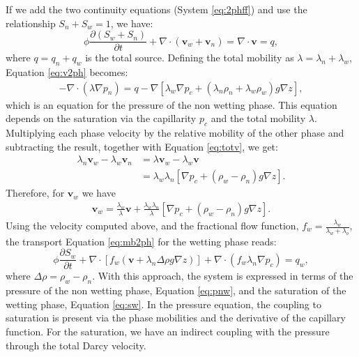 \documentclass[12pt]{article}
\begin{document}
If we add the two continuity equations (System \eqref{eq:2phff}) and use the relationship $S_n+S_w=1$, we have:
\begin{equation}\label{eq:v2ph}
 \phi\frac{\partial( {S}_{w}+S_n)}{\partial t}+\nabla \cdot ( \mathbf{v}_{w}+\mathbf{v}_n)=  \nabla \cdot \mathbf{v}=q,
\end{equation}
where $q=q_n+q_w$ is the total source. Defining the total mobility as $\lambda=\lambda_n+\lambda_w$, Equation \eqref{eq:v2ph} becomes:
\begin{align}\label{eq:pnw}
-\nabla \cdot (\lambda \nabla p_n)=q-\nabla[\lambda_w\nabla p_c+(\lambda_n\rho_n+\lambda_w\rho_w)g\nabla z],
\end{align}
which is an equation for the pressure of the non wetting phase. This equation depends on the saturation via the capillarity $p_c$ and the total mobility $\lambda$.\\
Multiplying each phase velocity by the relative mobility of the other phase and subtracting the result, together with Equation \eqref{eq:totv}, we get:
\begin{align*}
\lambda_n\mathbf{v}_w-\lambda_w\mathbf{v}_n&=\lambda\mathbf{v}_w-\lambda_w\mathbf{v}\\
&=\lambda_w\lambda_n [\nabla p_c+(\rho_w-\rho_n)g\nabla z].
\end{align*}
Therefore, for $\mathbf{v}_w$ we have
\begin{align*}
\mathbf{v}_w=\frac{\lambda_w}{\lambda}\mathbf{v}+\frac{\lambda_w\lambda_n}{\lambda} [\nabla p_c+(\rho_w-\rho_n)g\nabla z].
\end{align*}
Using the velocity computed above, and the fractional flow function,  $f_{w}=\frac{\lambda_{w}}{\lambda_{w}+\lambda_{o}},$ the transport Equation \eqref{eq:mb2ph} for the wetting phase reads:
\begin{equation}\label{eq:sw}
 \phi\frac{\partial {S}_{w}}{\partial t}+\nabla \cdot [f_w( \mathbf{v}+\lambda_n\Delta  \rho g\nabla z)]+\nabla \cdot(f_w\lambda_n\nabla p_c)= q_w,
\end{equation}
where $\Delta \rho= \rho_w-\rho_n.$
With this approach, the system is expressed in terms of the pressure of the non wetting phase, Equation \eqref{eq:pnw}, and the saturation of the wetting phase, Equation \eqref{eq:sw}.
In the pressure equation,
the coupling to saturation is present via the phase mobilities and the derivative of the capillary function. For the saturation, we have an indirect
coupling with the pressure through the total Darcy velocity. \\
\end{document}
